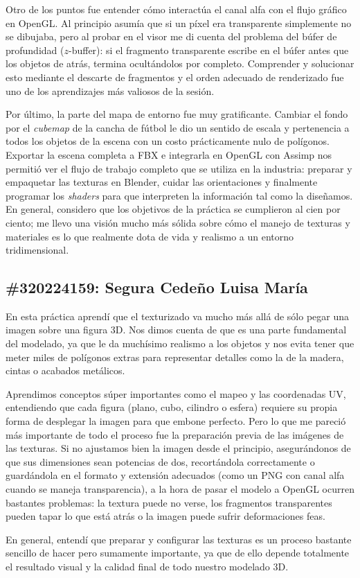 Otro de los puntos fue entender cómo interactúa el canal alfa con el flujo gráfico en OpenGL. Al principio asumía que si un píxel era transparente simplemente no se dibujaba, pero al probar en el visor me di cuenta del problema del búfer de profundidad ($z$-buffer): si el fragmento transparente escribe en el búfer antes que los objetos de atrás, termina ocultándolos por completo. Comprender y solucionar esto mediante el descarte de fragmentos y el orden adecuado de renderizado fue uno de los aprendizajes más valiosos de la sesión.

Por último, la parte del mapa de entorno fue muy gratificante. Cambiar el fondo por el \textit{cubemap} de la cancha de fútbol le dio un sentido de escala y pertenencia a todos los objetos de la escena con un costo prácticamente nulo de polígonos. Exportar la escena completa a FBX e integrarla en OpenGL con Assimp nos permitió ver el flujo de trabajo completo que se utiliza en la industria: preparar y empaquetar las texturas en Blender, cuidar las orientaciones y finalmente programar los \textit{shaders} para que interpreten la información tal como la diseñamos. En general, considero que los objetivos de la práctica se cumplieron al cien por ciento; me llevo una visión mucho más sólida sobre cómo el manejo de texturas y materiales es lo que realmente dota de vida y realismo a un entorno tridimensional.

\subsection*{\#320224159: Segura Cedeño Luisa María}
En esta práctica aprendí que el texturizado va mucho más allá de sólo pegar una imagen sobre una figura 3D. Nos dimos cuenta de que es una parte fundamental del modelado, ya que le da muchísimo realismo a los objetos y nos evita tener que meter miles de polígonos extras para representar detalles como la de la madera, cintas o acabados metálicos.  

Aprendimos conceptos súper importantes como el mapeo y las coordenadas UV, entendiendo que cada figura (plano, cubo, cilindro o esfera) requiere su propia forma de desplegar la imagen para que embone perfecto. Pero lo que me pareció más importante de todo el proceso fue la preparación previa de las imágenes de las texturas. Si no ajustamos bien la imagen desde el principio, asegurándonos de que sus dimensiones sean potencias de dos, recortándola correctamente o guardándola en el formato y extensión adecuados (como un PNG con canal alfa cuando se maneja transparencia), a la hora de pasar el modelo a OpenGL ocurren bastantes problemas: la textura puede no verse, los fragmentos transparentes pueden tapar lo que está atrás o la imagen puede sufrir deformaciones feas.

En general, entendí que preparar y configurar las texturas es un proceso bastante sencillo de hacer pero sumamente importante, ya que de ello depende totalmente el resultado visual y la calidad final de todo nuestro modelado 3D.  
